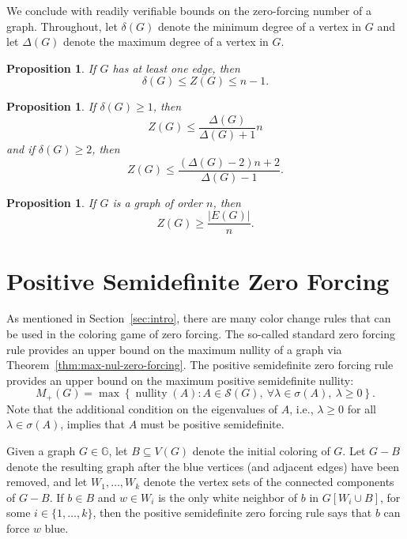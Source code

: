 \documentclass{article}
\newtheorem{proposition}[theorem]{Proposition}
\theoremstyle{definition}
\newcommand\abs[1]{\left|#1\right|}
\newcommand\nullity[1]{\operatorname{nullity}\left(#1\right)}
\begin{document}
We conclude with readily verifiable bounds on the zero-forcing number of a graph. 
Throughout, let $\delta(G)$ denote the minimum degree of a vertex in $G$ and let $\Delta(G)$ denote the maximum degree of a vertex in $G$.
\begin{proposition}\label{prop:zf-bound}
If $G$ has at least one edge, then
\[
\delta(G) \leq Z(G) \leq n - 1.
\]
\end{proposition}

\begin{proposition}\label{prop:zf-ubound}
If $\delta(G)\geq 1$, then 
\[
Z(G) \leq \frac{\Delta(G)}{\Delta(G)+1}n
\]
and if $\delta(G)\geq 2$, then
\[
Z(G) \leq \frac{\left(\Delta(G)-2\right)n+2}{\Delta(G)-1}.
\]
\end{proposition}

\begin{proposition}\label{prop:zf-lbound}
If $G$ is a graph of order $n$, then
\[
Z(G) \geq \frac{\abs{E(G)}}{n}.
\]
\end{proposition}


\section{Positive Semidefinite Zero Forcing}\label{sec:psd-zf}
As mentioned in Section~\ref{sec:intro}, there are many color change rules that can be used in the coloring game of zero forcing. 
The so-called standard zero forcing rule provides an upper bound on the maximum nullity of a graph via Theorem~\ref{thm:max-nul-zero-forcing}.
The positive semidefinite zero forcing rule provides an upper bound on the maximum positive semidefinite nullity:
\[
M_{+}(G) = \max\left\{\nullity{A}\colon A\in\mathcal{S}(G),~\forall\lambda\in\sigma(A),~\lambda\geq 0\right\}.
\]
Note that the additional condition on the eigenvalues of $A$, i.e., $\lambda\geq 0$ for all $\lambda\in\sigma(A)$, implies that $A$ must be positive semidefinite. 

Given a graph $G\in\mathbb{G}$, let $B\subseteq V(G)$ denote the initial coloring of $G$. 
Let $G-B$ denote the resulting graph after the blue vertices (and adjacent edges) have been removed, and let $W_{1},\ldots,W_{k}$ denote the vertex sets of the connected components of $G-B$.
If $b\in B$ and $w\in W_{i}$ is the only white neighbor of $b$ in $G[W_{i}\cup B]$, for some $i\in\{1,\ldots,k\}$, then the positive semidefinite zero forcing rule says that $b$ can force $w$ blue.
\end{document}

